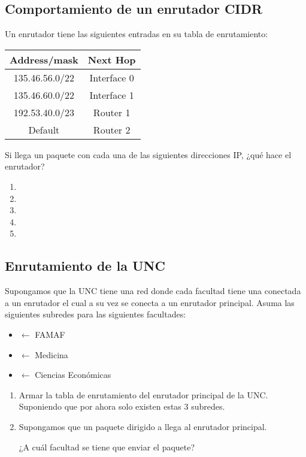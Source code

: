 \documentclass[12pt]{report}
\begin{document}
\begin{exer}
\subsection{Comportamiento de un enrutador CIDR \sthree}
 Un enrutador tiene las siguientes entradas  en su tabla de enrutamiento:\\
 
\begin{center}
\begin{tabular}{| c | c |} 
 \hline
 Address/mask & Next Hop \\
 \hline \hline
 135.46.56.0/22 & Interface 0 \\
 \hline
 135.46.60.0/22 & Interface 1 \\
 \hline
 192.53.40.0/23 & Router 1 \\
 \hline
 Default & Router 2 \\
 \hline
\end{tabular}
\end{center}

Si llega un paquete con cada una de las siguientes direcciones IP, ¿qué hace el enrutador?

\begin{enumerate}
\item {}
\item {}
\item {}
\item {}
\item {}
\end{enumerate}
\end{exer}

\begin{exer}
\subsection{Enrutamiento de la UNC \sfour}
Supongamos que la UNC tiene una red donde cada facultad tiene una  conectada a un enrutador el cual a su vez se conecta a un enrutador principal. Asuma las siguientes subredes para las siguientes facultades:

\begin{itemize}
\item {} $\leftarrow$ FAMAF
\item {} $\leftarrow$ Medicina
\item {} $\leftarrow$ Ciencias Económicas
\end{itemize}

\begin{enumerate}
\item Armar la tabla de enrutamiento del enrutador principal de la UNC. Suponiendo que
por ahora solo existen estas 3 subredes.
\item Supongamos que un paquete dirigido a  llega al enrutador principal. 

¿A cuál facultad se tiene que enviar el paquete?
\end{enumerate}
\end{exer}
\end{document}
